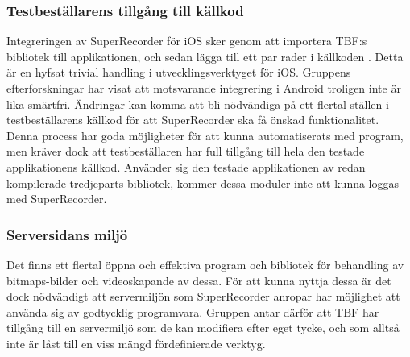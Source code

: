 \subsubsection{Testbeställarens tillgång till källkod}
Integreringen av SuperRecorder för iOS sker genom att importera TBF:s bibliotek till applikationen, och sedan lägga till ett par rader i källkoden \parencite{superrec}. Detta är en hyfsat trivial handling i utvecklingsverktyget för iOS. Gruppens efterforskningar har visat att motsvarande integrering i Android troligen inte är lika smärtfri. Ändringar kan komma att bli nödvändiga på ett flertal ställen i testbeställarens källkod för att SuperRecorder ska få önskad funktionalitet. Denna process har goda möjligheter för att kunna automatiserats med program, men kräver dock att testbeställaren har full tillgång till hela den testade applikationens källkod. Använder sig den testade applikationen av redan kompilerade tredjeparts-bibliotek, kommer dessa moduler inte att kunna loggas med SuperRecorder.

\subsubsection{Serversidans miljö}
\label{subsubsec:serverside}
Det finns ett flertal öppna och effektiva program och bibliotek för behandling av bitmaps-bilder och videoskapande av dessa. För att kunna nyttja dessa är det dock nödvändigt att servermiljön som SuperRecorder anropar har möjlighet att använda sig av godtycklig programvara. Gruppen antar därför att TBF har tillgång till en servermiljö som de kan modifiera efter eget tycke, och som alltså inte är låst till en viss mängd fördefinierade verktyg.
